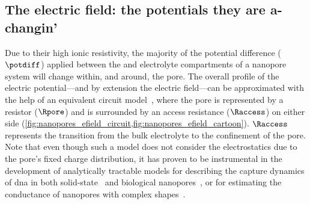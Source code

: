 \subsection{The electric field: the potentials they are a-changin'}
%
\label{sec:np:potential}
%

Due to their high ionic resistivity, the majority of the potential difference ($\potdiff$) applied between the
\cisi{} and \transi{} electrolyte compartments of a nanopore system will change within, and around, the pore.
The overall profile of the electric potential---and by extension the electric field---can be approximated with
the help of an equivalent circuit model~\cite{Wanunu-2009,Grosberg-2010,Kowalczyk-2011}, where the pore is
represented by a resistor ($\Rpore$) and is surrounded by an access resistance ($\Raccess$) on either side
(\cref{fig:nanopores_efield_circuit,fig:nanopores_efield_cartoon}). $\Raccess$ represents the transition from
the bulk electrolyte to the confinement of the pore. Note that even though such a model does not consider the
electrostatics due to the pore's fixed charge distribution, it has proven to be instrumental in the
development of analytically tractable models for describing the capture dynamics of \gls{dna} in both
solid-state~\cite{Wanunu-2009,Grosberg-2010,Muthukumar-2010} and biological
nanopores~\cite{Chinappi-2015,Nomidis-2018}, or for estimating the conductance of nanopores with complex
shapes~\cite{Wanunu-2009,Kowalczyk-2011}.

